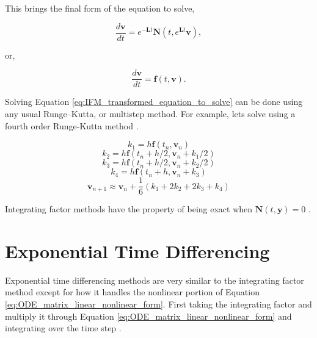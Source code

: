 \noindent
This brings the final form of the equation to solve, 

\begin{equation}
    \frac{d\boldsymbol{v}}{dt} = e^{-\boldsymbol{L}t}\boldsymbol{N}(t,e^{\boldsymbol{L}t}\boldsymbol{v}), 
\end{equation}{}

\noindent
or, 

\begin{equation}
    \frac{d\boldsymbol{v}}{dt} = \boldsymbol{f}(t,\boldsymbol{v}).
    \label{eq:IFM_transformed_equation_to_solve}
\end{equation}{}

Solving Equation \ref{eq:IFM_transformed_equation_to_solve} can be done using any usual Runge–Kutta, or multistep method. For example, lets solve using a fourth order Runge-Kutta method \cite{Kassam2005}.


\begin{equation*}
    k_{1} = h\boldsymbol{f}(t_{n},\boldsymbol{v}_{n})
\end{equation*}{}
\vspace*{-1.0cm}
\begin{equation*}
    k_{2} = h\boldsymbol{f}(t_{n}+h/2, \boldsymbol{v}_{n} + k_{1}/2)
\end{equation*}{}
\vspace*{-1.0cm}
\begin{equation*}
    k_{3} = h\boldsymbol{f}(t_{n}+h/2, \boldsymbol{v}_{n} + k_{2}/2)
\end{equation*}{}
\vspace*{-1.0cm}
\begin{equation*}
    k_{4} = h\boldsymbol{f}(t_{n}+h, \boldsymbol{v}_{n} + k_{3})
\end{equation*}{}
\vspace*{-1.0cm}
\begin{equation}
    \boldsymbol{v}_{n+1} \approx \boldsymbol{v}_{n} + \frac{1}{6}(k_{1} + 2k_{2} + 2k_{3} + k_{4})
\end{equation}{}

\noindent



\noindent
Integrating factor methods have the property of being exact when $\boldsymbol{N}(t,\boldsymbol{y}) = 0$ \cite{ash2009}. 

\section{Exponential Time Differencing}
Exponential time differencing methods are very similar to the integrating factor method except for how it handles the nonlinear portion of Equation \ref{eq:ODE_matrix_linear_nonlinear_form}. First taking the integrating factor and multiply it through Equation \ref{eq:ODE_matrix_linear_nonlinear_form} and integrating over the time step \cite{cox2002}. 

